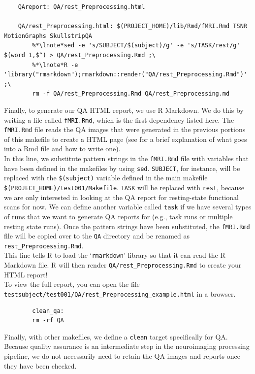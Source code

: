 \begin{lstlisting}
	QAreport: QA/rest_Preprocessing.html 

	QA/rest_Preprocessing.html: $(PROJECT_HOME)/lib/Rmd/fMRI.Rmd TSNR MotionGraphs SkullstripQA
		%*\lnote*sed -e 's/SUBJECT/$(subject)/g' -e 's/TASK/rest/g' $(word 1,$^) > QA/rest_Preprocessing.Rmd ;\
		%*\lnote*R -e 'library("rmarkdown");rmarkdown::render("QA/rest_Preprocessing.Rmd")' ;\
		rm -f QA/rest_Preprocessing.Rmd QA/rest_Preprocessing.md
\end{lstlisting}


Finally, to generate our QA HTML report, we use R Markdown. We do this by writing a file called \texttt{fMRI.Rmd}, which is the first dependency listed here. The \texttt{fMRI.Rmd} file reads the QA images that were generated in the previous portions of this makefile to create a HTML page (see  for a brief explanation of what goes into a Rmd file and how to write one). \\
 In this line, we substitute pattern strings in the \texttt{fMRI.Rmd} file with variables that have been defined in the makefiles by using \texttt{sed}. \texttt{SUBJECT}, for instance, will be replaced with the \texttt{\$(subject)} variable defined in the main makefile \texttt{\$(PROJECT\_HOME)/test001/Makefile}. \texttt{TASK} will be replaced with \texttt{rest}, because we are only interested in looking at the QA report for resting-state functional scans for now. We can define another variable called \texttt{task} if we have several types of runs that we want to generate QA reports for (e.g., task runs or multiple resting state runs). Once the pattern strings have been substituted, the \texttt{fMRI.Rmd} file will be copied over to the \texttt{QA} directory and be renamed as \texttt{rest\_Preprocessing.Rmd}. \\
 This line tells R to load the `\texttt{rmarkdown}' library so that it can read the R Markdown file. R will then render \texttt{QA/rest\_Preprocessing.Rmd} to create your HTML report! \\

To view the full report, you can open the file \texttt{testsubject/test001/QA/rest_Preprocessing_example.html} in a browser.


\begin{lstlisting}
		clean_qa: 
		rm -rf QA
\end{lstlisting}

Finally, with other makefiles, we define a \texttt{clean} target specifically for QA. Because quality assurance is an intermediate step in the neuroimaging processing pipeline, we do not necessarily need to retain the QA images and reports once they have been checked.


